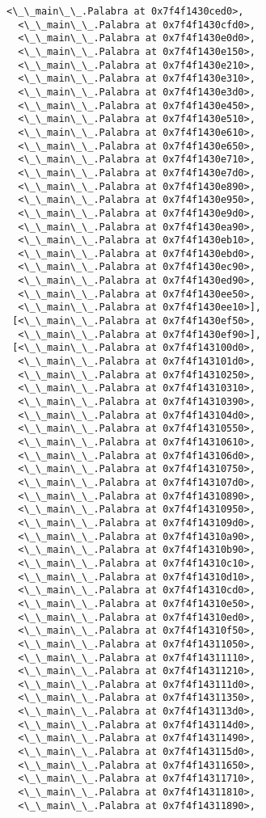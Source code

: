 \documentclass[12pt,a4paper,table]{article}
\begin{document}
\begin{tcolorbox}[breakable, size=fbox, boxrule=.5pt, pad at break*=1mm, opacityfill=0]
\begin{Verbatim}[commandchars=\\\{\}]
  <\_\_main\_\_.Palabra at 0x7f4f1430ced0>,
  <\_\_main\_\_.Palabra at 0x7f4f1430cfd0>,
  <\_\_main\_\_.Palabra at 0x7f4f1430e0d0>,
  <\_\_main\_\_.Palabra at 0x7f4f1430e150>,
  <\_\_main\_\_.Palabra at 0x7f4f1430e210>,
  <\_\_main\_\_.Palabra at 0x7f4f1430e310>,
  <\_\_main\_\_.Palabra at 0x7f4f1430e3d0>,
  <\_\_main\_\_.Palabra at 0x7f4f1430e450>,
  <\_\_main\_\_.Palabra at 0x7f4f1430e510>,
  <\_\_main\_\_.Palabra at 0x7f4f1430e610>,
  <\_\_main\_\_.Palabra at 0x7f4f1430e650>,
  <\_\_main\_\_.Palabra at 0x7f4f1430e710>,
  <\_\_main\_\_.Palabra at 0x7f4f1430e7d0>,
  <\_\_main\_\_.Palabra at 0x7f4f1430e890>,
  <\_\_main\_\_.Palabra at 0x7f4f1430e950>,
  <\_\_main\_\_.Palabra at 0x7f4f1430e9d0>,
  <\_\_main\_\_.Palabra at 0x7f4f1430ea90>,
  <\_\_main\_\_.Palabra at 0x7f4f1430eb10>,
  <\_\_main\_\_.Palabra at 0x7f4f1430ebd0>,
  <\_\_main\_\_.Palabra at 0x7f4f1430ec90>,
  <\_\_main\_\_.Palabra at 0x7f4f1430ed90>,
  <\_\_main\_\_.Palabra at 0x7f4f1430ee50>,
  <\_\_main\_\_.Palabra at 0x7f4f1430ee10>],
 [<\_\_main\_\_.Palabra at 0x7f4f1430ef50>,
  <\_\_main\_\_.Palabra at 0x7f4f1430ef90>],
 [<\_\_main\_\_.Palabra at 0x7f4f143100d0>,
  <\_\_main\_\_.Palabra at 0x7f4f143101d0>,
  <\_\_main\_\_.Palabra at 0x7f4f14310250>,
  <\_\_main\_\_.Palabra at 0x7f4f14310310>,
  <\_\_main\_\_.Palabra at 0x7f4f14310390>,
  <\_\_main\_\_.Palabra at 0x7f4f143104d0>,
  <\_\_main\_\_.Palabra at 0x7f4f14310550>,
  <\_\_main\_\_.Palabra at 0x7f4f14310610>,
  <\_\_main\_\_.Palabra at 0x7f4f143106d0>,
  <\_\_main\_\_.Palabra at 0x7f4f14310750>,
  <\_\_main\_\_.Palabra at 0x7f4f143107d0>,
  <\_\_main\_\_.Palabra at 0x7f4f14310890>,
  <\_\_main\_\_.Palabra at 0x7f4f14310950>,
  <\_\_main\_\_.Palabra at 0x7f4f143109d0>,
  <\_\_main\_\_.Palabra at 0x7f4f14310a90>,
  <\_\_main\_\_.Palabra at 0x7f4f14310b90>,
  <\_\_main\_\_.Palabra at 0x7f4f14310c10>,
  <\_\_main\_\_.Palabra at 0x7f4f14310d10>,
  <\_\_main\_\_.Palabra at 0x7f4f14310cd0>,
  <\_\_main\_\_.Palabra at 0x7f4f14310e50>,
  <\_\_main\_\_.Palabra at 0x7f4f14310ed0>,
  <\_\_main\_\_.Palabra at 0x7f4f14310f50>,
  <\_\_main\_\_.Palabra at 0x7f4f14311050>,
  <\_\_main\_\_.Palabra at 0x7f4f14311110>,
  <\_\_main\_\_.Palabra at 0x7f4f14311210>,
  <\_\_main\_\_.Palabra at 0x7f4f143111d0>,
  <\_\_main\_\_.Palabra at 0x7f4f14311350>,
  <\_\_main\_\_.Palabra at 0x7f4f143113d0>,
  <\_\_main\_\_.Palabra at 0x7f4f143114d0>,
  <\_\_main\_\_.Palabra at 0x7f4f14311490>,
  <\_\_main\_\_.Palabra at 0x7f4f143115d0>,
  <\_\_main\_\_.Palabra at 0x7f4f14311650>,
  <\_\_main\_\_.Palabra at 0x7f4f14311710>,
  <\_\_main\_\_.Palabra at 0x7f4f14311810>,
  <\_\_main\_\_.Palabra at 0x7f4f14311890>,

\end{Verbatim}
\end{tcolorbox}
\end{document}
